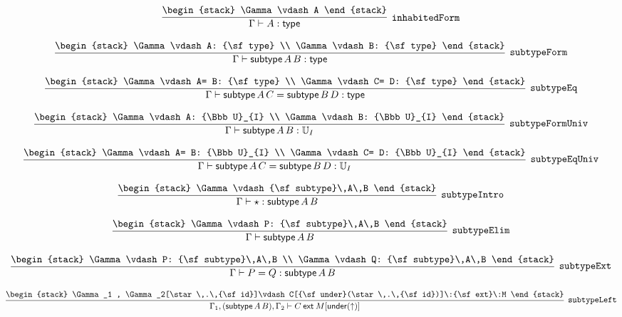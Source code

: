 \[
\infer[{\tt inhabitedForm}]{\Gamma \vdash A: {\sf type}}{
\begin{stack}
\Gamma \vdash A
\end{stack}}
\]

\[
\infer[{\tt subtypeForm}]{\Gamma \vdash {\sf subtype}\,A\,B: {\sf type}}{
\begin{stack}
\Gamma \vdash A: {\sf type}
\\
\Gamma \vdash B: {\sf type}
\end{stack}}
\]

\[
\infer[{\tt subtypeEq}]{\Gamma \vdash {\sf subtype}\,A\,C= {\sf subtype}\,B\,D: {\sf type}}{
\begin{stack}
\Gamma \vdash A= B: {\sf type}
\\
\Gamma \vdash C= D: {\sf type}
\end{stack}}
\]

\[
\infer[{\tt subtypeFormUniv}]{\Gamma \vdash {\sf subtype}\,A\,B: {\Bbb U}_{I}}{
\begin{stack}
\Gamma \vdash A: {\Bbb U}_{I}
\\
\Gamma \vdash B: {\Bbb U}_{I}
\end{stack}}
\]

\[
\infer[{\tt subtypeEqUniv}]{\Gamma \vdash {\sf subtype}\,A\,C= {\sf subtype}\,B\,D: {\Bbb U}_{I}}{
\begin{stack}
\Gamma \vdash A= B: {\Bbb U}_{I}
\\
\Gamma \vdash C= D: {\Bbb U}_{I}
\end{stack}}
\]

\[
\infer[{\tt subtypeIntro}]{\Gamma \vdash \star : {\sf subtype}\,A\,B}{
\begin{stack}
\Gamma \vdash {\sf subtype}\,A\,B
\end{stack}}
\]

\[
\infer[{\tt subtypeElim}]{\Gamma \vdash {\sf subtype}\,A\,B}{
\begin{stack}
\Gamma \vdash P: {\sf subtype}\,A\,B
\end{stack}}
\]

\[
\infer[{\tt subtypeExt}]{\Gamma \vdash P= Q: {\sf subtype}\,A\,B}{
\begin{stack}
\Gamma \vdash P: {\sf subtype}\,A\,B
\\
\Gamma \vdash Q: {\sf subtype}\,A\,B
\end{stack}}
\]

\[
\infer[{\tt subtypeLeft}]{\Gamma_1 ,({\sf subtype}\,A\,B), \Gamma_2 \vdash C\:{\sf ext}\:M[{\sf under}(\uparrow )]}{
\begin{stack}
\Gamma_1 , \Gamma_2[\star \,.\,{\sf id}]\vdash C[{\sf under}(\star \,.\,{\sf id})]\:{\sf ext}\:M
\end{stack}}
\]

